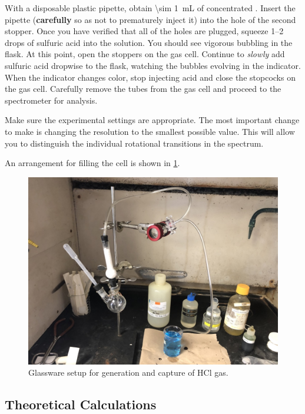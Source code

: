 \documentclass[nobib,nofonts,nols,nohyper]{tufte-handout}
\begin{document}
With a disposable plastic pipette, obtain \SI{\sim 1}{\mL} of concentrated . 
Insert the pipette (\textbf{carefully} so as not to prematurely inject it) into the hole of the second stopper. 
Once you have verified that all of the holes are plugged, squeeze \numrange{1}{2} drops of sulfuric acid into the solution. 
You should see vigorous bubbling in the flask. 
At this point, open the stoppers on the gas cell. 
Continue to \emph{slowly} add sulfuric acid dropwise to the flask, watching the bubbles evolving in the indicator. 
When the indicator changes color, stop injecting acid and close the stopcocks on the gas cell. 
Carefully remove the tubes from the gas cell and proceed to the spectrometer for analysis. 

Make sure the experimental settings are appropriate. 
The most important change to make is changing the resolution to the smallest possible value. 
This will allow you to distinguish the individual rotational transitions in the spectrum. 

An arrangement for filling the cell is shown in \cref{fig:cell_filling}.

\begin{figure}[htb]
  \centering
    \includegraphics[width=.9\textwidth]{images/exp_setup_landscape.jpg}
  \caption{Glassware setup for generation and capture of HCl gas.}
  \label{fig:cell_filling}
\end{figure}



\subsection{Theoretical Calculations} %
\label{sub:theoretical_calculations}
\end{document}

